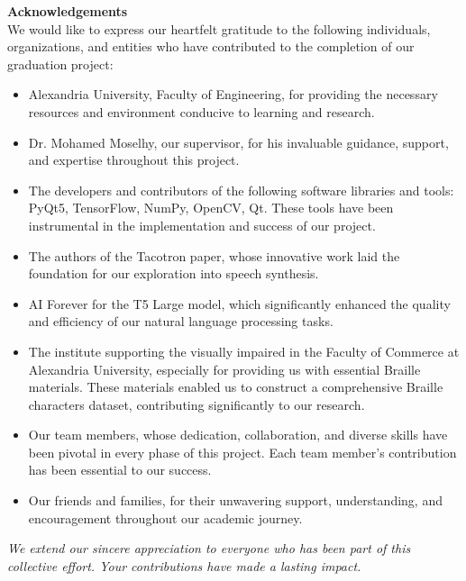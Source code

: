 \textbf{\large Acknowledgements}\\


We would like to express our heartfelt gratitude to the following individuals, organizations, and entities who have contributed to the completion of our graduation project:

\begin{itemize}
    \item Alexandria University, Faculty of Engineering, for providing the necessary resources and environment conducive to learning and research.
    \item Dr. Mohamed Moselhy, our supervisor, for his invaluable guidance, support, and expertise throughout this project.
    \item The developers and contributors of the following software libraries and tools: PyQt5, TensorFlow, NumPy, OpenCV, Qt. These tools have been instrumental in the implementation and success of our project.
    \item The authors of the Tacotron paper, whose innovative work laid the foundation for our exploration into speech synthesis.
    \item AI Forever for the T5 Large model, which significantly enhanced the quality and efficiency of our natural language processing tasks.
    \item The institute supporting the visually impaired in the Faculty of Commerce at Alexandria University, especially for providing us with essential Braille materials. These materials enabled us to construct a comprehensive Braille characters dataset, contributing significantly to our research.
    \item Our team members, whose dedication, collaboration, and diverse skills have been pivotal in every phase of this project. Each team member's contribution has been essential to our success.
    \item Our friends and families, for their unwavering support, understanding, and encouragement throughout our academic journey.
\end{itemize}

\textit{We extend our sincere appreciation to everyone who has been part of this collective effort. Your contributions have made a lasting impact.}

